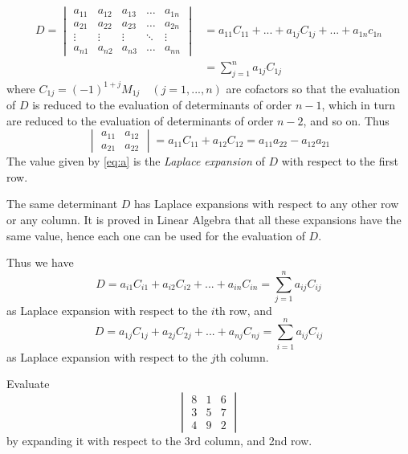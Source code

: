 \documentclass[11pt]{amsbook}
\begin{document}
\begin{equation} \label{eq:a} \tag{1}
\begin{aligned}
D = \begin{vmatrix}
    a_{11} & a_{12} & a_{13} & \dots  & a_{1n} \\
    a_{21} & a_{22} & a_{23} & \dots  & a_{2n} \\
    \vdots & \vdots & \vdots & \ddots & \vdots \\
    a_{n1} & a_{n2} & a_{n3} & \dots  & a_{nn} 
\end{vmatrix} &= a_{11}C_{11} +  ... + a_{1j}C_{1j} + ... + a_{1n}c_{1n} \\ &= \sum_{j=1}^n  a_{1j}C_{1j}
\end{aligned}
\end{equation}
where $C_{1j} = (-1)^{1+j} M_{1j} \quad (j = 1 , ... , n)$ are cofactors so that
the evaluation of $D$ is reduced to the evaluation of determinants
of order $n - 1$, which in turn are reduced to the evaluation of
determinants of order $n - 2$, and so on. Thus
$$
\begin{vmatrix}
	a_{11} & a_{12} \\
	a_{21} & a_{22}
\end{vmatrix} = a_{11}C_{11} + a_{12}C_{12} = a_{11}a_{22} - a_{12}a_{21}
$$
The value given by \ref{eq:a} is the \textit{Laplace expansion} of $D$ with respect
to the first row.
\par The same determinant $D$ has Laplace expansions with
respect to any other row or any column. It is proved in Linear
Algebra that all these expansions have the same value, hence
each one can be used for the evaluation of $D$.
\par Thus we have
\begin{equation} \tag{2}
D = a_{i1}C_{i1} + a_{i2}C_{i2} + ... + a_{in}C_{in} = \sum_{j=1}^n a_{ij}C_{ij}
\end{equation}
as Laplace expansion with respect to the $i$th row, and
\begin{equation} \tag{3}
D = a_{1j}C_{1j} + a_{2j}C_{2j} + ... + a_{nj}C_{nj} = \sum_{i=1}^n a_{ij}C_{ij}
\end{equation}
as Laplace expansion with respect to the $j$th column.
\begin{exmp}
Evaluate
$$
\begin{vmatrix}
	8 & 1 & 6 \\
	3 & 5 & 7 \\
	4 & 9 & 2
\end{vmatrix}
$$
by expanding it with respect to the 3rd column, and 2nd row.
\end{exmp}
\end{document}
